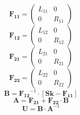\[ \mathbf{F_{11}} = \left(\begin{smallmatrix} L_{11} & 0 \\ 0 &
R_{11} \end{smallmatrix}\right) \]
\[ \mathbf{F_{12}} = \left(\begin{smallmatrix} L_{12} & 0 \\ 0 &
R_{12} \end{smallmatrix}\right) \]
\[ \mathbf{F_{21}} = \left(\begin{smallmatrix} L_{21} & 0 \\ 0 &
R_{21} \end{smallmatrix}\right) \]
\[ \mathbf{F_{22}} = \left(\begin{smallmatrix} L_{22} & 0 \\ 0 &
R_{22} \end{smallmatrix}\right) \]
\[ \mathbf{B}=\mathbf{F_{12}}^{-1}\cdot\left[ \mathbf{Sk} -
\mathbf{F_{11}} \right]  \]
\[ \mathbf{A}=\mathbf{F_{21}}+ \mathbf{F_{22}}\cdot\mathbf{B} \]
\[ \mathbf{U} = \mathbf{B} \cdot \mathbf{A}^{-1} \]
